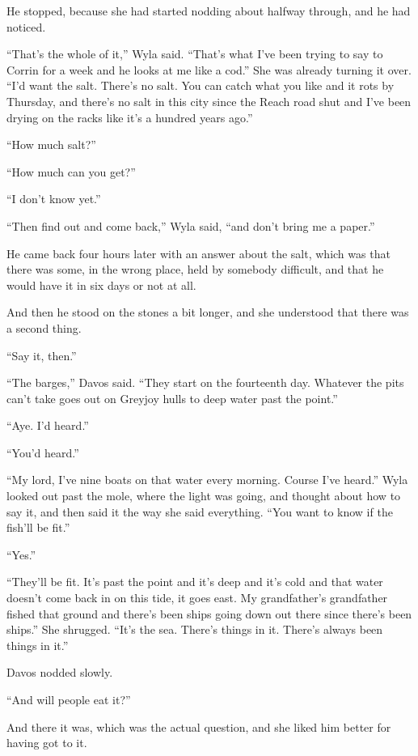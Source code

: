 He stopped, because she had started nodding about halfway through, and he had noticed.

“That’s the whole of it,” Wyla said. “That’s what I’ve been trying to say to Corrin for a week and he looks at me like a cod.” She was already turning it over. “I’d want the salt. There’s no salt. You can catch what you like and it rots by Thursday, and there’s no salt in this city since the Reach road shut and I’ve been drying on the racks like it’s a hundred years ago.”

“How much salt?”

“How much can you get?”

“I don’t know yet.”

“Then find out and come back,” Wyla said, “and don’t bring me a paper.”

\sceneBreak

He came back four hours later with an answer about the salt, which was that there was some, in the wrong place, held by somebody difficult, and that he would have it in six days or not at all.

And then he stood on the stones a bit longer, and she understood that there was a second thing.

“Say it, then.”

“The barges,” Davos said. “They start on the fourteenth day. Whatever the pits can’t take goes out on Greyjoy hulls to deep water past the point.”

“Aye. I’d heard.”

“You’d heard.”

“My lord, I’ve nine boats on that water every morning. Course I’ve heard.” Wyla looked out past the mole, where the light was going, and thought about how to say it, and then said it the way she said everything. “You want to know if the fish’ll be fit.”

“Yes.”

“They’ll be fit. It’s past the point and it’s deep and it’s cold and that water doesn’t come back in on this tide, it goes east. My grandfather’s grandfather fished that ground and there’s been ships going down out there since there’s been ships.” She shrugged. “It’s the sea. There’s things in it. There’s always been things in it.”

Davos nodded slowly.

“And will people eat it?”

And there it was, which was the actual question, and she liked him better for having got to it.


